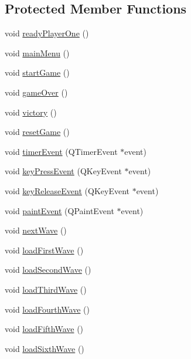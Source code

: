 \subsection*{Protected Member Functions}
\begin{DoxyCompactItemize}
\item 
void \hyperlink{classGameWidget_a198ea51c7a1352a9b0fd8fe5634a1322}{readyPlayerOne} ()
\item 
void \hyperlink{classGameWidget_a694457f8936c3f28470a6110224dda68}{mainMenu} ()
\item 
void \hyperlink{classGameWidget_aaef4c2312ada597ad67e83b79520ce65}{startGame} ()
\item 
void \hyperlink{classGameWidget_acc73be7fb24bd1a2f107f7793cb49b47}{gameOver} ()
\item 
void \hyperlink{classGameWidget_a3b226760b90670ad2ad1ddb5a80a73d2}{victory} ()
\item 
void \hyperlink{classGameWidget_acd19f060f66bb0b49eb18dfe0b60b71c}{resetGame} ()
\item 
void \hyperlink{classGameWidget_a47a187d96dcc0f90d1ddaab764e8cab2}{timerEvent} (QTimerEvent $\ast$event)
\item 
void \hyperlink{classGameWidget_a13b69687699966d57a7edeab5ba69824}{keyPressEvent} (QKeyEvent $\ast$event)
\item 
void \hyperlink{classGameWidget_ad4778d46b507f8e97170e0482f3e5a67}{keyReleaseEvent} (QKeyEvent $\ast$event)
\item 
void \hyperlink{classGameWidget_ac3985eb71fe2666565c9e54536ee3ecb}{paintEvent} (QPaintEvent $\ast$event)
\item 
void \hyperlink{classGameWidget_afdbc9010f357a8aa24c338149bbc3a1e}{nextWave} ()
\item 
void \hyperlink{classGameWidget_a5f37eb9e2db938f865c9d2d234d4588d}{loadFirstWave} ()
\item 
void \hyperlink{classGameWidget_a5a6813ac6a21d8eaf4304afba324bc7c}{loadSecondWave} ()
\item 
void \hyperlink{classGameWidget_a09b458fcc598f4f153d2593755c963fb}{loadThirdWave} ()
\item 
void \hyperlink{classGameWidget_ae63a48dc36dbe5904c81bda1f634b1a2}{loadFourthWave} ()
\item 
void \hyperlink{classGameWidget_acc2c7f9843bbc9c70e79beb56d515021}{loadFifthWave} ()
\item 
void \hyperlink{classGameWidget_a67accab7f35805e85c066e1367552933}{loadSixthWave} ()
\item 

\end{DoxyCompactItemize}
